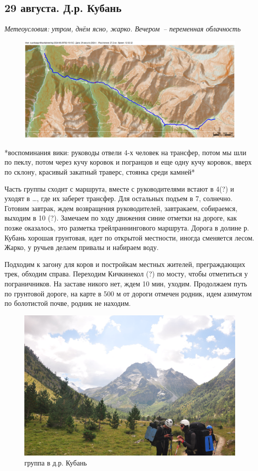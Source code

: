 \subsection{29 августа. Д.р. Кубань}
\textit{Метеоусловия: утром, днём ясно, жарко. Вечером~-- переменная облачность}

\begin{figure}[h!]
	\centering
	\includegraphics[angle=0, width=0.3\linewidth]{../pics/mini_maps/29}
	\label{fig:mini_29}
\end{figure}

*воспоминания вики: руководы отвели 4-х человек на трансфер, потом мы шли по пеклу, потом через кучу коровок и погранцов и еще одну кучу коровок, вверх по склону, красивый закатный траверс, стоянка среди камней*


Часть группы сходит с маршрута, вместе с руководителями встают в 4(?) и уходят в …, где их заберет трансфер. Для остальных подъем в 7, солнечно. Готовим завтрак, ждем возвращения руководителей, завтракаем, собираемся, выходим в 10 (?). Замечаем по ходу движения синие отметки на дороге, как позже оказалось, это разметка трейлраннингового маршрута.
Дорога в долине р. Кубань хорошая грунтовая, идет по открытой местности, иногда сменяется лесом. Жарко, у ручьев делаем привалы и набираем воду.

Подходим к загону для коров и постройкам местных жителей, преграждающих трек, обходим справа.
Переходим Кичкинекол (?) по мосту, чтобы отметиться у пограничников. На заставе никого нет, ждем 10 мин, уходим.
Продолжаем путь по грунтовой дороге, на карте в 500 м от дороги отмечен родник, идем азимутом по болотистой почве, родник не находим.

\begin{figure}[h!]
	\centering
	\includegraphics[width=0.7\linewidth]{../pics/DSC_0462 2.JPG}
	\caption{группа в д.р. Кубань}
	\label{fig:DSC_0462 2.JPG}
\end{figure}

